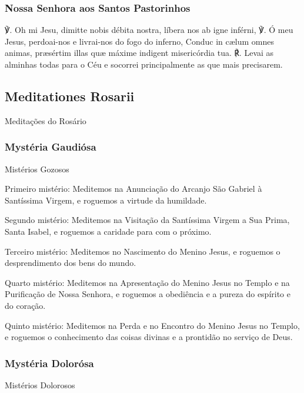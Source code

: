 \subsubsection{Nossa Senhora aos Santos Pastorinhos}

\begin{paracol}{2}
{\redx ℣.} Oh mi Jesu, dimitte nobis débita nostra, líbera nos ab igne inférni,
\switchcolumn
{\redx ℣.} Ó meu Jesus, perdoai-nos e livrai-nos do fogo do inferno,
 Conduc in cælum omnes animas, præsértim illas quæ máxime indigent
misericórdia tua.
\switchcolumn
{\redx ℟.} Levai as alminhas todas para o Céu e socorrei principalmente as que mais
precisarem.
\end{paracol}

\subsection{Meditationes Rosarii}
\begin{nscenter}Meditações do Rosário\end{nscenter}
\subsubsection{Mystéria Gaudiósa}
\begin{nscenter}Mistérios Gozosos\end{nscenter}
\begin{nscenter}\emph{}\end{nscenter}

{\redx Primeiro mistério:} Meditemos na Anunciação do Arcanjo São Gabriel à Santíssima Virgem, e roguemos a virtude da humildade.\par
{\redx Segundo mistério:} Meditemos na Visitação da Santíssima Virgem a Sua Prima, Santa Isabel, e roguemos a caridade para com o próximo.\par
{\redx Terceiro mistério:} Meditemos no Nascimento do Menino Jesus, e roguemos o desprendimento dos bens do mundo.\par
{\redx Quarto mistério:} Meditemos na Apresentação do Menino Jesus no Templo e na Purificação de Nossa Senhora, e roguemos a obediência e a pureza do espírito e do coração.\par
{\redx Quinto mistério:} Meditemos na Perda e no Encontro do Menino Jesus no Templo, e roguemos o conhecimento das coisas divinas e a prontidão no serviço de Deus.

\subsubsection{Mystéria Dolorósa}
\begin{nscenter}Mistérios Dolorosos\end{nscenter}
\begin{nscenter}\emph{}\end{nscenter}


